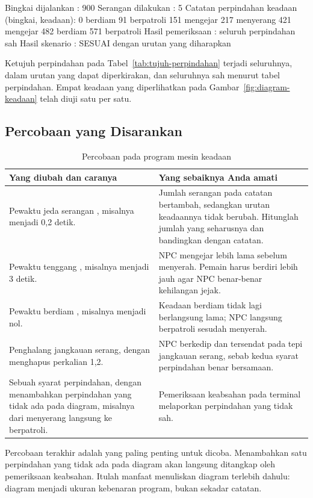 \begin{kodekeluaran}
Bingkai dijalankan : 900
Serangan dilakukan : 5
Catatan perpindahan keadaan (bingkai, keadaan):
        0  berdiam
       91  berpatroli
      151  mengejar
      217  menyerang
      421  mengejar
      482  berdiam
      571  berpatroli
Hasil pemeriksaan  : seluruh perpindahan sah
Hasil skenario     : SESUAI dengan urutan yang diharapkan
\end{kodekeluaran}

Ketujuh perpindahan pada Tabel~\ref{tab:tujuh-perpindahan} terjadi seluruhnya,
dalam urutan yang dapat diperkirakan, dan seluruhnya sah menurut tabel
perpindahan. Empat keadaan yang diperlihatkan pada
Gambar~\ref{fig:diagram-keadaan} telah diuji satu per satu.

\subsection{Percobaan yang Disarankan}

\begin{table}[htbp]
\centering
\caption{Percobaan pada program mesin keadaan}
\label{tab:percobaan-ch09}
{\setlength{\tabcolsep}{4pt}\footnotesize%
\begin{tabularx}{\textwidth}{@{}L{5.6cm} Y@{}}
\toprule
\headrow \textbf{Yang diubah dan caranya} & \textbf{Yang sebaiknya Anda amati} \\
\midrule
Pewaktu jeda serangan , misalnya menjadi 0,2 detik. &
Jumlah serangan pada catatan bertambah, sedangkan urutan keadaannya tidak
berubah. Hitunglah jumlah yang seharusnya dan bandingkan dengan catatan. \\
\addlinespace
Pewaktu tenggang , misalnya menjadi 3 detik. &
NPC mengejar lebih lama sebelum menyerah. Pemain harus berdiri
lebih jauh agar NPC benar-benar kehilangan jejak. \\
\addlinespace
Pewaktu berdiam , misalnya menjadi nol. &
Keadaan berdiam tidak lagi berlangsung lama; NPC langsung berpatroli sesudah
menyerah. \\
\addlinespace
Penghalang jangkauan serang, dengan menghapus perkalian 1,2. &
NPC berkedip dan tersendat pada tepi jangkauan serang, sebab kedua syarat
perpindahan benar bersamaan. \\
\addlinespace
Sebuah syarat perpindahan, dengan menambahkan perpindahan yang tidak ada pada
diagram, misalnya dari menyerang langsung ke berpatroli. &
Pemeriksaan keabsahan pada terminal melaporkan perpindahan yang tidak sah. \\
\bottomrule
\end{tabularx}}
\end{table}

\begin{peringatanbox}
Percobaan terakhir adalah yang paling penting untuk dicoba. Menambahkan satu
perpindahan yang tidak ada pada diagram akan langsung ditangkap oleh
pemeriksaan keabsahan. Itulah manfaat menuliskan diagram terlebih dahulu:
diagram menjadi ukuran kebenaran program, bukan sekadar catatan.
\end{peringatanbox}
